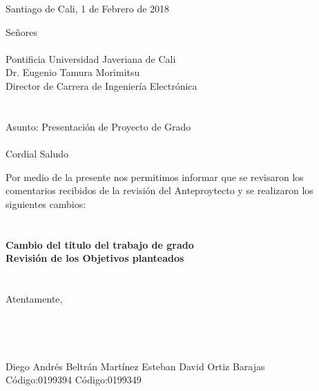 \begin{flushright}
Santiago de Cali, 1 de Febrero de 2018
\end{flushright}
Señores
\\
\\
Pontificia Universidad Javeriana de Cali\\
Dr. Eugenio Tamura Morimitsu\\
Director de Carrera de Ingeniería Electrónica\\
\\
\\
Asunto: Presentación de Proyecto de Grado\\
\\
Cordial Saludo

Por medio de la presente nos permitimos informar que se revisaron los comentarios recibidos de la revisión del Anteproytecto y se realizaron los siguientes cambios:\\
\\
\\
\textbf{Cambio del titulo del trabajo de grado}\\
\textbf{Revisión de los Objetivos planteados}\\
\\
\\
Atentamente,\\
\\
\\
\\
\\
Diego Andrés Beltrán Martínez \qquad \qquad \qquad Esteban David Ortiz Barajas\\
Código:0199394 \qquad \qquad \qquad \qquad \qquad \qquad \quad Código:0199349
\newpage